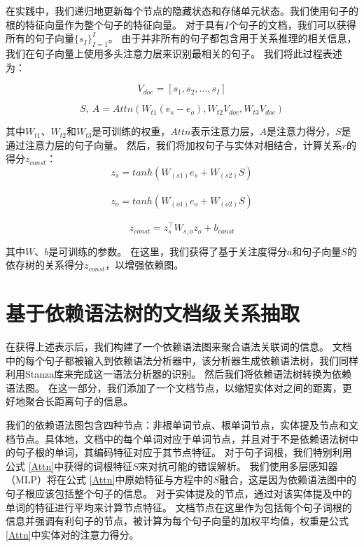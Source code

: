 \documentclass[bachelor]{thesis-uestc}
\begin{document}
在实践中，我们递归地更新每个节点的隐藏状态和存储单元状态。我们使用句子的根的特征向量作为整个句子的特征向量。
对于具有$I$个句子的文档，我们可以获得所有的句子向量$\{s_I\}_{I=1}^{I}$。
由于并非所有的句子都包含用于关系推理的相关信息，我们在句子向量上使用多头注意力层来识别最相关的句子。
我们将此过程表述为：

\begin{equation}
    V_{doc} = [s_1, s_2, \dots, s_I]
\end{equation}

\begin{equation}
    S,\  A = Attn(W_{t1}(e_s-e_o), W_{t2} V_{doc}, W_{t3} V_{doc})
    \label{Attn}
\end{equation}

其中$W_{t1}、W_{t2}$和$W_{t3}$是可训练的权重，$Attn$表示注意力层，$A$是注意力得分，$S$是通过注意力层的句子向量。
然后，我们将加权句子与实体对相结合，计算关系$r$的得分$z_{const}$：
\begin{equation}
    z_s = tanh(W_{(s1)}e_s+W_{(s2)}S)
\end{equation}
\\
\begin{equation}
    z_o = tanh(W_{(o1)}e_o+W_{(o2)}S)
\end{equation}
\\
\begin{equation}
    z_{const} = z_s^\top W_{s, o}z_o+b_{const}
\end{equation}

其中$W、b$是可训练的参数。
在这里，我们获得了基于关注度得分$a$和句子向量$S$的依存树的关系得分$z_{const}$，以增强依赖图。\par

\section{基于依赖语法树的文档级关系抽取}

在获得上述表示后，我们构建了一个依赖语法图来聚合语法关联词的信息。
文档中的每个句子都被输入到依赖语法分析器中，该分析器生成依赖语法树，我们同样利用Stanza库来完成这一语法分析器的识别。
然后我们将依赖语法树转换为依赖语法图。
在这一部分，我们添加了一个文档节点，以缩短实体对之间的距离，更好地聚合长距离句子的信息。\par

我们的依赖语法图包含四种节点：非根单词节点、根单词节点，实体提及节点和文档节点。具体地，文档中的每个单词对应于单词节点，并且对于不是依赖语法树中的句子根的单词，其编码特征对应于其节点特征。
对于句子词根，我们特别利用公式 \ref{Attn}中获得的词根特征$S$来对抗可能的错误解析。
我们使用多层感知器（MLP）将在公式 \ref{Attn}中原始特征与方程中的$S$融合，这是因为依赖语法图中的句子根应该包括整个句子的信息。
对于实体提及的节点，通过对该实体提及中的单词的特征进行平均来计算节点特征。
文档节点在这里作为包括每个句子词根的信息并强调有利句子的节点，被计算为每个句子向量的加权平均值，权重是公式 \ref{Attn}中实体对的注意力得分。\par
\end{document}
